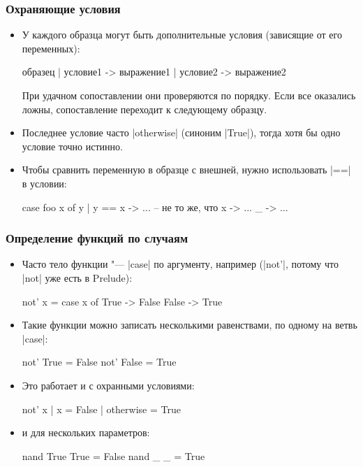 \documentclass[10pt]{beamer}
\begin{document}
\begin{frame}[fragile]
  \frametitle{Охраняющие условия}
  \begin{itemize}
    \item У каждого образца могут быть дополнительные условия (зависящие от его переменных):
          \begin{haskell}
            образец
                | условие1 -> выражение1 
                | условие2 -> выражение2
          \end{haskell}
          При удачном сопоставлении они проверяются по порядку. Если все оказались ложны, сопоставление переходит к следующему образцу.
    \item Последнее условие часто \haskinline|otherwise| (синоним \haskinline|True|), тогда хотя бы одно условие точно истинно.
    \item Чтобы сравнить переменную в образце с внешней, нужно использовать \haskinline|==| в условии:
          \begin{haskell}
            case foo x of
                y | y == x -> ... -- не то же, что x -> ...
                _ -> ...
          \end{haskell}
  \end{itemize}
\end{frame}

\begin{frame}[fragile]
  \frametitle{Определение функций по случаям}
  \begin{itemize}
    \item Часто тело функции "--- \haskinline|case| по аргументу, например (\haskinline|not'|, потому что \haskinline|not| уже есть в Prelude):
          \begin{haskell}
            not' x = case x of
                True -> False
                False -> True
          \end{haskell}
    \item Такие функции можно записать несколькими равенствами, по одному на ветвь \haskinline|case|:
          \begin{haskell}
            not' True = False
            not' False = True
          \end{haskell}
    \item Это работает и с охранными условиями:
          \begin{haskell}
            not' x | x = False
                   | otherwise = True
          \end{haskell}
    \item и для нескольких параметров:
          \begin{haskell}
            nand True True = False
            nand _    _ = True
          \end{haskell}
  \end{itemize}
\end{frame}
\end{document}
